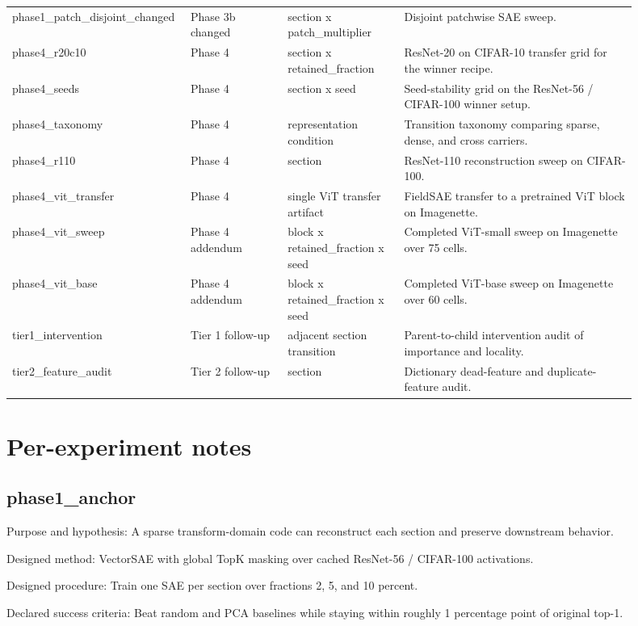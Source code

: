 \documentclass[11pt]{article}
\begin{document}
\begin{longtable}{p{0.21\linewidth}p{0.15\linewidth}p{0.18\linewidth}p{0.36\linewidth}}
phase1\_patch\_disjoint\_changed & Phase 3b changed & section x patch\_multiplier & Disjoint patchwise SAE sweep. \\
phase4\_r20c10 & Phase 4 & section x retained\_fraction & ResNet-20 on CIFAR-10 transfer grid for the winner recipe. \\
phase4\_seeds & Phase 4 & section x seed & Seed-stability grid on the ResNet-56 / CIFAR-100 winner setup. \\
phase4\_taxonomy & Phase 4 & representation condition & Transition taxonomy comparing sparse, dense, and cross carriers. \\
phase4\_r110 & Phase 4 & section & ResNet-110 reconstruction sweep on CIFAR-100. \\
phase4\_vit\_transfer & Phase 4 & single ViT transfer artifact & FieldSAE transfer to a pretrained ViT block on Imagenette. \\
phase4\_vit\_sweep & Phase 4 addendum & block x retained\_fraction x seed & Completed ViT-small sweep on Imagenette over 75 cells. \\
phase4\_vit\_base & Phase 4 addendum & block x retained\_fraction x seed & Completed ViT-base sweep on Imagenette over 60 cells. \\
tier1\_intervention & Tier 1 follow-up & adjacent section transition & Parent-to-child intervention audit of importance and locality. \\
tier2\_feature\_audit & Tier 2 follow-up & section & Dictionary dead-feature and duplicate-feature audit. \\
\bottomrule
\end{longtable}
\section{Per-experiment notes}
\subsection{phase1\_anchor}
Purpose and hypothesis: A sparse transform-domain code can reconstruct each section and preserve downstream behavior.


Designed method: VectorSAE with global TopK masking over cached ResNet-56 / CIFAR-100 activations.


Designed procedure: Train one SAE per section over fractions 2, 5, and 10 percent.


Declared success criteria: Beat random and PCA baselines while staying within roughly 1 percentage point of original top-1.
\end{document}
